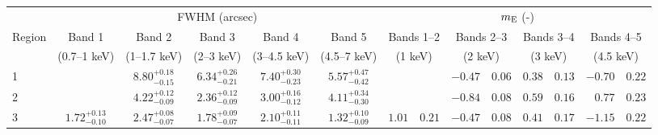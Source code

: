 \begin{tabular}{@{}l ccccc r@{ $\pm$ }l r@{ $\pm$ }l r@{ $\pm$ }l r@{ $\pm$ }l @{}}

\toprule
{} & \multicolumn{5}{c}{FWHM (arcsec)} & \multicolumn{8}{c}{$m_\mathrm{E}$ (-)} \\
\cmidrule(lr){2-6} \cmidrule(l){7-14}
Region & Band 1 & Band 2 & Band 3 & Band 4 & Band 5
       & \multicolumn{2}{c}{Bands 1--2} & \multicolumn{2}{c}{Bands 2--3}
       & \multicolumn{2}{c}{Bands 3--4} & \multicolumn{2}{c}{Bands 4--5} \\ [0.2em]
{} & (0.7--1 keV) & (1--1.7 keV) & (2--3 keV) & (3--4.5 keV) & (4.5--7 keV)
   & \multicolumn{2}{c}{(1 keV)} & \multicolumn{2}{c}{(2 keV)}
   & \multicolumn{2}{c}{(3 keV)} & \multicolumn{2}{c}{(4.5 keV)} \\
\midrule
1 & {} & ${8.80}^{+0.18}_{-0.15}$ & ${6.34}^{+0.26}_{-0.21}$ & ${7.40}^{+0.30}_{-0.23}$ & ${5.57}^{+0.47}_{-0.42}$
  & \multicolumn{2}{c}{} & $-0.47$ & $0.06$ & $0.38$ & $0.13$ & $-0.70$ & $0.22$ \\ [0.5em]
2 & {} & ${4.22}^{+0.12}_{-0.09}$ & ${2.36}^{+0.12}_{-0.09}$ & ${3.00}^{+0.16}_{-0.12}$ & ${4.11}^{+0.34}_{-0.30}$
  & \multicolumn{2}{c}{} & $-0.84$ & $0.08$ & $0.59$ & $0.16$ & $0.77$ & $0.23$ \\ [0.5em]
3 & ${1.72}^{+0.13}_{-0.10}$ & ${2.47}^{+0.08}_{-0.07}$ & ${1.78}^{+0.09}_{-0.07}$ & ${2.10}^{+0.11}_{-0.11}$ & ${1.32}^{+0.10}_{-0.09}$
  & $1.01$ & $0.21$ & $-0.47$ & $0.08$ & $0.41$ & $0.17$ & $-1.15$ & $0.22$ \\


\end{tabular}
